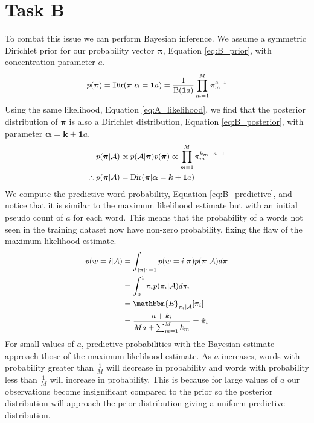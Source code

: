 \documentclass[11pt]{article}
\begin{document}
\section{Task B}
To combat this issue we can perform Bayesian inference. We assume a symmetric Dirichlet prior for our probability vector $\boldsymbol{\pi}$, Equation \ref{eq:B_prior}, with concentration parameter $a$.
\begin{equation}
    \small
    \begin{aligned}
        p(\boldsymbol{\pi}) = \text{Dir}(\boldsymbol{\pi} | \boldsymbol{\alpha} = \boldsymbol{1} a) = \frac{1}{\text{B}(\boldsymbol{1} a)} \prod_{m=1}^{M} \pi_m^{a - 1}
    \end{aligned}
    \label{eq:B_prior}
\end{equation}
Using the same likelihood, Equation \ref{eq:A_likelihood}, we find that the posterior distribution of $\boldsymbol{\pi}$ is also a Dirichlet distribution, Equation \ref{eq:B_posterior}, with parameter $\boldsymbol{\alpha} = \boldsymbol{k} + \boldsymbol{1} a$.
\begin{equation}
    \small
    \begin{aligned}
        p(\boldsymbol{\pi} | \mathcal{A}) &\propto p(\mathcal{A} | \boldsymbol{\pi}) p(\boldsymbol{\pi}) \propto \prod_{m=1}^{M} \pi_m^{k_m + a - 1} \\
        \therefore p(\boldsymbol{\pi} | \mathcal{A}) &= \text{Dir}(\boldsymbol{\pi} | \boldsymbol{\alpha} = \boldsymbol{k} + \boldsymbol{1} a)
    \end{aligned}
    \label{eq:B_posterior}
\end{equation}
We compute the predictive word probability, Equation \ref{eq:B_predictive}, and notice that it is similar to the maximum likelihood estimate but with an initial pseudo count of $a$ for each word. This means that the probability of a words not seen in the training dataset now have non-zero probability, fixing the flaw of the maximum likelihood estimate.
\begin{equation}
    \small
    \begin{aligned}
        p(w = i | \mathcal{A}) &= \int_{|\boldsymbol{\pi}|_1=1} p(w = i | \boldsymbol{\pi}) p(\boldsymbol{\pi} | \mathcal{A}) d\boldsymbol{\pi} \\
          &= \int_{0}^{1} \pi_i p(\pi_i | \mathcal{A}) d\pi_i \\
          &= \mathbbm{E}_{\pi_i|\mathcal{A}}[\pi_i] \\
          &= \frac{a + k_i}{M a + \sum_{m=1}^{M} k_m} = \hat \pi_i \\
    \end{aligned}
    \label{eq:B_predictive}
\end{equation}
For small values of $a$, predictive probabilities with the Bayesian estimate approach those of the maximum likelihood estimate. As $a$ increases, words with probability greater than $\frac{1}{M}$ will decrease in probability and words with probability less than $\frac{1}{M}$ will increase in probability. This is because for large values of $a$ our observations become insignificant compared to the prior so the posterior distribution will approach the prior distribution giving a uniform predictive distribution.
\end{document}

